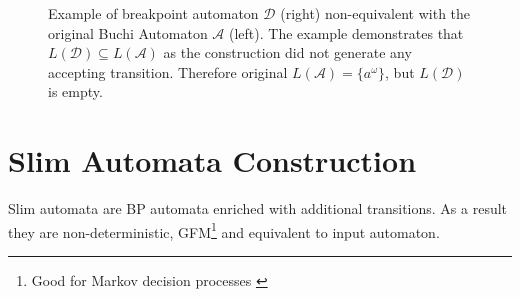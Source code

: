 \documentclass[
	digital
nolof, nolot
]{fithesis3}
\newcommand{\cA}{\mathcal{A}}
\newcommand{\cD}{\mathcal{D}}
\newcommand{\lA}{L(\cA)}
\newcommand{\lD}{L(\cD)}
\newcommand{\flushed}{\text{\emoji{flushed}}}
\newcommand{\hell}{\text{\emoji{fire}}}
\newcommand{\heaven}{\text{\emoji{innocent}}}
\begin{document}
			\begin{figure}[ht]
				\begin{center}
				\end{center}
				\caption{Example of breakpoint automaton $\cD$ (right) non-equivalent with the original Buchi Automaton $\cA$ (left). The example demonstrates that $\lD \subseteq \lA$ as the construction did not generate any accepting transition. Therefore original $\lA=\{a^\omega\}$, but $\lD$ is empty.}
				\label{fig:bp:non-equivalent}
			\end{figure}
			
			
			
			\chapter{Slim Automata Construction}\label{section:slim}
			
			
			
			Slim automata are BP automata enriched with additional transitions. As a result they are non-deterministic, GFM\footnote{Good for Markov decision processes \cite{hlavni}} and equivalent to input automaton.
			
\end{document}
